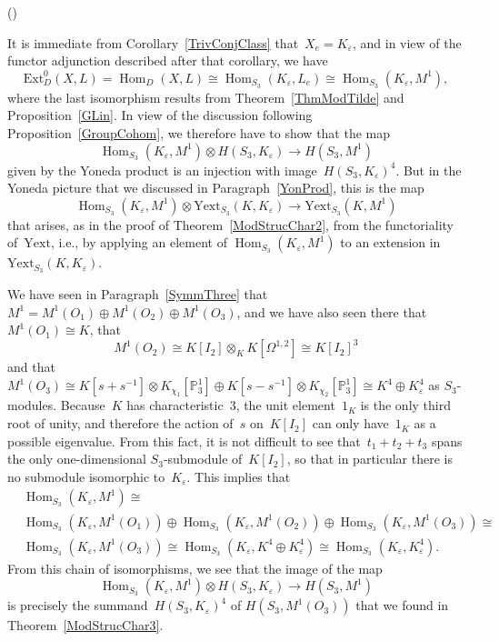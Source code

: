 \documentclass[12pt]{article}
\makeatletter
\newcounter{num}
\newenvironment{pflist}{\begin{list}{(\arabic{num})}{\usecounter{num} \leftmargin0cm \itemindent5pt}}{\end{list}}
\theoremstyle{definition}
\theoremstyle{break}
\renewenvironment{proof}[1][\proofname]{\par
\vspace{-5pt}%
\pushQED{\qed}%
\normalfont
\topsep0pt \partopsep0pt %
\trivlist
\item[\hskip\labelsep
\bfseries
#1\@addpunct{.}]\ignorespaces
}{%
\popQED\endtrivlist\@endpefalse
\addvspace{6pt plus 6pt} %
}
\DeclareMathOperator\Hom{Hom}
\renewcommand{\P}{\mathbb{P}}
\newcommand{\Ext}{\mathrm{Ext}}
\newcommand{\Yext}{\mathrm{Yext}}
\renewcommand{\1}{\mathbbm{1}}
\renewcommand{\P}{\mathbb{P}}
\newcommand{\ot}{\mathbin{\otimes}}
\makeatother
\begin{document}
\begin{proof}
\begin{pflist}
\item
It is immediate from Corollary~\ref{TrivConjClass} that~$X_e = K_\varepsilon$, and in view of the functor adjunction described after that corollary, we have
\[\Ext^0_D(X, L) = \Hom_D(X, L) \cong \Hom_{S_3}(K_\varepsilon, L_e)
\cong \Hom_{S_3}(K_\varepsilon, M^1),\]
where the last isomorphism results from Theorem~\ref{ThmModTilde} and Proposition~\ref{GLin}. In view of the discussion following Proposition~\ref{GroupCohom}, we therefore have to show that the map
\[\Hom_{S_3}(K_\varepsilon, M^1) \ot H(S _3, K_\varepsilon) \to H(S_3, M^1) \]
given by the Yoneda product is an injection with image~$H(S_3, K_\varepsilon)^4$. But in the Yoneda picture that we discussed in Paragraph~\ref{YonProd}, this is the map
\[\Hom_{S_3}(K_\varepsilon, M^1) \ot \Yext_{S_3}(K, K_\varepsilon) \to
\Yext_{S_3}(K, M^1) \]
that arises, as in the proof of Theorem~\ref{ModStrucChar2}, from the functoriality of~$\Yext$, i.e., by applying an element of
$\Hom_{S_3}(K_\varepsilon, M^1)$ to an extension in $\Yext_{S_3}(K, K_\varepsilon)$.

\item
We have seen in Paragraph~\ref{SymmThree} that
$M^1 = M^1(O_1) \oplus M^1(O_2) \oplus M^1(O_3)$,
and we have also seen there that~$M^1(O_1) \cong K$,
that
\[M^1(O_2) \cong K[I_2] \otimes_{K} K[\Omega^{1,2}] \cong K[I_2]^3\]
and that~$M^1(O_3) \cong
K[s + s^{-1}] \ot K_{\chi_1}[\P_3^{1}] \oplus K[s - s^{-1}] \ot K_{\chi_2}[\P_3^{1}]
\cong K^4 \oplus K_\varepsilon^4$ as $S_3$-modules. Because~$K$ has characteristic~$3$, the unit element~$1_K$ is the only third root of unity, and therefore the action of~$s$ on~$K[I_2]$ can only have~$1_K$ as a possible eigenvalue. From this fact, it is not difficult to see that~$t_1 + t_2 + t_3$ spans the only one-dimensional $S_3$-submodule of~$K[I_2]$, so that in particular there is no submodule isomorphic to~$K_\varepsilon$. This implies that
\begin{align*}
&\Hom_{S_3}(K_\varepsilon, M^1) \cong \\
&\Hom_{S_3}(K_\varepsilon, M^1(O_1)) \oplus \Hom_{S_3}(K_\varepsilon, M^1(O_2))
\oplus \Hom_{S_3}(K_\varepsilon, M^1(O_3)) \cong \\
&\Hom_{S_3}(K_\varepsilon, M^1(O_3)) \cong
\Hom_{S_3}(K_\varepsilon, K^4 \oplus K_\varepsilon^4) \cong
\Hom_{S_3}(K_\varepsilon, K_\varepsilon^4).
\end{align*}
From this chain of isomorphisms, we see that the image of the map
\[\Hom_{S_3}(K_\varepsilon, M^1) \ot H(S _3, K_\varepsilon) \to H(S_3, M^1) \]
is precisely the summand~$H(S_3, K_\varepsilon)^4$ of $H(S_3, M^1(O_3))$ that we found in Theorem~\ref{ModStrucChar3}.
\qedhere
\end{pflist}
\end{proof}
\end{document}

